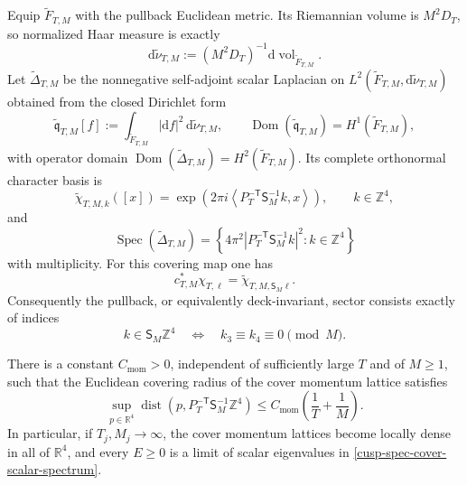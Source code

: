 \begin{theorem}
Equip \(\widetilde F_{T,M}\) with the pullback Euclidean metric.  Its
Riemannian volume is \(M^2D_T\), so normalized Haar measure is exactly
\[
 \mathrm d\widetilde\nu_{T,M}
 :=(M^2D_T)^{-1}\mathrm d\operatorname{vol}_{\widetilde F_{T,M}}.
\]
Let \(\widetilde\Delta_{T,M}\) be the nonnegative self-adjoint scalar
Laplacian on \(L^2(\widetilde F_{T,M},\mathrm d\widetilde\nu_{T,M})\)
obtained from the closed Dirichlet form
\[
 \widetilde{\mathfrak q}_{T,M}[f]
 :=\int_{\widetilde F_{T,M}}|\mathrm df|^2\,
        \mathrm d\widetilde\nu_{T,M},
 \qquad
 \operatorname{Dom}(\widetilde{\mathfrak q}_{T,M})
 =H^1(\widetilde F_{T,M}),
\]
with operator domain
\(\operatorname{Dom}(\widetilde\Delta_{T,M})
=H^2(\widetilde F_{T,M})\).  Its complete orthonormal character basis is
\begin{equation}
 \widetilde\chi_{T,M,k}([x])
 =
 \exp\!\left(
  2\pi i
  \left\langle P_T^{-\mathsf T}\mathsf S_M^{-1}k,x\right\rangle
 \right),
 \qquad k\in\mathbb Z^4,
 \label{cusp-spec-cover-characters}
\end{equation}
and
\begin{equation}
 \operatorname{Spec}(\widetilde\Delta_{T,M})
 =
 \left\{
  4\pi^2
  \left\lvert P_T^{-\mathsf T}\mathsf S_M^{-1}k\right\rvert^2:
  k\in\mathbb Z^4
 \right\}
 \label{cusp-spec-cover-scalar-spectrum}
\end{equation}
with multiplicity.  For this covering map one has
\begin{equation}
 c_{T,M}^*\chi_{T,\ell}
 =\widetilde\chi_{T,M,\mathsf S_M\ell}.
 \label{cusp-spec-cover-character-pullback}
\end{equation}
Consequently the pullback, or equivalently deck-invariant, sector consists
exactly of indices
\begin{equation}
 k\in\mathsf S_M\mathbb Z^4
 \quad\Longleftrightarrow\quad
 k_3\equiv k_4\equiv0\pmod M.
 \label{cusp-spec-cover-invariant-sector}
\end{equation}

There is a constant \(C_{\mathrm{mom}}>0\), independent of sufficiently
large \(T\) and of \(M\ge1\), such that the Euclidean covering radius of
the cover momentum lattice satisfies
\begin{equation}
 \sup_{p\in\mathbb R^4}
 \operatorname{dist}\!\left(
  p,P_T^{-\mathsf T}\mathsf S_M^{-1}\mathbb Z^4
 \right)
 \le C_{\mathrm{mom}}\left(\frac1T+\frac1M\right).
 \label{cusp-spec-cover-momentum-mesh}
\end{equation}
In particular, if \(T_j,M_j\to\infty\), the cover momentum lattices become
locally dense in all of \(\mathbb R^4\), and every \(E\ge0\) is a limit of
scalar eigenvalues in
\cref{cusp-spec-cover-scalar-spectrum}.
\end{theorem}

